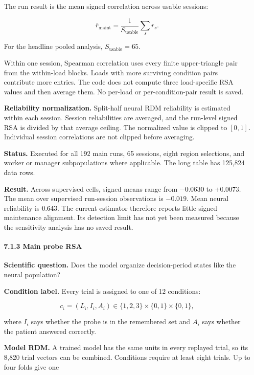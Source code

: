 \documentclass[
  10pt,
]{article}
\begin{document}
The run result is the mean signed correlation across usable sessions:

\[
\bar r_{\mathrm{maint}}
=
\frac{1}{S_{\mathrm{usable}}}
\sum_s r_s.
\]

For the headline pooled analysis, \(S_{\mathrm{usable}}=65\).

Within one session, Spearman correlation uses every finite
upper-triangle pair from the within-load blocks. Loads with more
surviving condition pairs contribute more entries. The code does not
compute three load-specific RSA values and then average them. No
per-load or per-condition-pair result is saved.

\textbf{Reliability normalization.} Split-half neural RDM reliability is
estimated within each session. Session reliabilities are averaged, and
the run-level signed RSA is divided by that average ceiling. The
normalized value is clipped to \([0,1]\). Individual session
correlations are not clipped before averaging.

\textbf{Status.} Executed for all 192 main runs, 65 sessions, eight
region selections, and worker or manager subpopulations where
applicable. The long table has 125,824 data rows.

\textbf{Result.} Across supervised cells, signed means range from
\(-0.0630\) to \(+0.0073\). The mean over supervised run-session
observations is \(-0.019\). Mean neural reliability is 0.643. The
current estimator therefore reports little signed maintenance alignment.
Its detection limit has not yet been measured because the sensitivity
analysis has no saved result.

\hypertarget{main-probe-rsa}{%
\paragraph{7.1.3 Main probe RSA}\label{main-probe-rsa}}

\textbf{Scientific question.} Does the model organize decision-period
states like the neural population?

\textbf{Condition label.} Every trial is assigned to one of 12
conditions:

\[
c_i=(L_i,I_i,A_i)
\in
\{1,2,3\}\times\{0,1\}\times\{0,1\},
\]

where \(I_i\) says whether the probe is in the remembered set and
\(A_i\) says whether the patient answered correctly.

\textbf{Model RDM.} A trained model has the same units in every replayed
trial, so its 8,820 trial vectors can be combined. Conditions require at
least eight trials. Up to four folds give one
\end{document}
